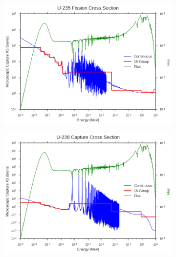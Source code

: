 \begin{figure}
\begin{subfigure}{.5\textwidth}
  \caption{}
\end{subfigure}
\begin{subfigure}{.5\textwidth}
  \centering
  \includegraphics[width=\linewidth]{figures/intro/u235-fission-16}
  \caption{}
\end{subfigure}
\begin{subfigure}{.5\textwidth}
  \centering
  \includegraphics[width=\linewidth]{figures/intro/u238-capture-16}
  \caption{}
\end{subfigure}
\begin{subfigure}{.5\textwidth}
  \centering

\end{subfigure}
\end{figure}
